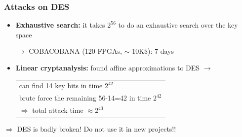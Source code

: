 \documentclass[aspectratio=169, lualatex, handout, 10pt,dvipsnames,svgnames]{beamer} %
\def\enrouge#1{\textcolor{rouge}{#1}}
\begin{document}
\begin{frame}

  \frametitle{Attacks on DES}

  \pause

  \begin{itemize}
  \item {\bf Exhaustive search:} it takes $2^{56}$ to do an exhaustive search over the key space

    $\longrightarrow$ COBACOBANA (120 FPGAs, $\sim$ 10K\$): 7 days 
    \bigskip{}
    \pause

  \item {\bf Linear cryptanalysis:} found affine approximations to DES
    $\longrightarrow$\begin{tabular}[t]{l}
      can find 14 key bits in time $2^{42}$ \\
      brute force the remaining 56-14=42 in time $2^{42}$ \\
      $\Rightarrow$ total attack time $\approx 2^{43}$
    \end{tabular}
  \end{itemize}
  \bigskip{}
  \pause
  
  \enrouge{$\Rightarrow$ DES is badly broken! Do not use it in new projects!!}

\end{frame}
\end{document}
